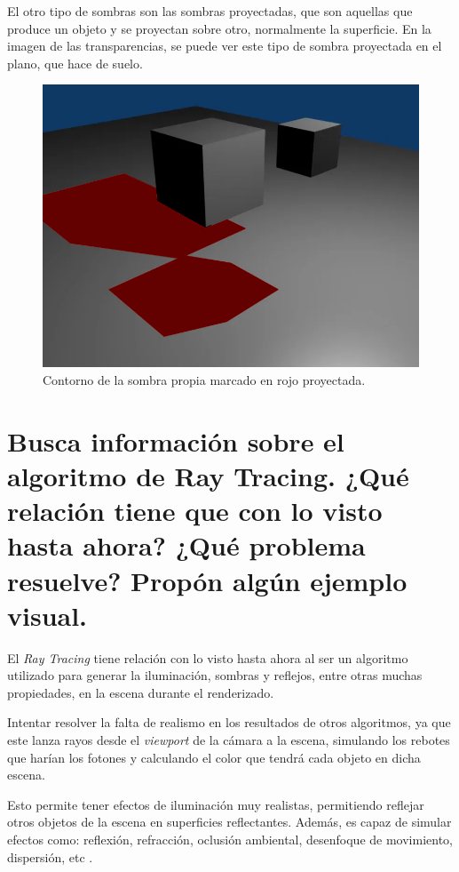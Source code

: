 \documentclass{article}
\begin{document}
El otro tipo de sombras son las sombras proyectadas, que son aquellas que produce un objeto y se proyectan sobre otro, normalmente la superficie. En la imagen de las transparencias, se puede ver este tipo de sombra proyectada en el plano, que hace de suelo.

\begin{figure}[H]
    \centering
    \includegraphics[width=\textwidth]{imagenes/sombra0004proy.png}
    \caption{Contorno de la sombra propia marcado en rojo proyectada.}
 \end{figure}    

\section{Busca información sobre el algoritmo de Ray Tracing. ¿Qué relación tiene que con lo visto hasta ahora? ¿Qué problema resuelve? Propón algún ejemplo visual.}

El \textit{Ray Tracing} tiene relación con lo visto hasta ahora al ser un algoritmo utilizado para generar la iluminación, sombras y reflejos, entre otras muchas propiedades, en la escena durante el renderizado.

Intentar resolver la falta de realismo en los resultados de otros algoritmos, ya que este lanza rayos desde el \textit{viewport} de la cámara a la escena, simulando los rebotes que harían los fotones y calculando el color que tendrá cada objeto en dicha escena. 

Esto permite tener efectos de iluminación muy realistas, permitiendo reflejar otros objetos de la escena en superficies reflectantes. Además, es capaz de simular efectos como: reflexión, refracción, oclusión ambiental, desenfoque de movimiento, dispersión, etc \cite{raytracing}.
\end{document}

